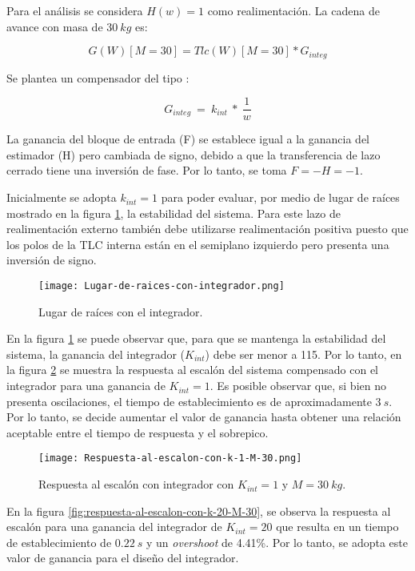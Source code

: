  Para el an\'{a}lisis se considera $H(w)=1$ como realimentaci\'{o}n. La cadena de avance con masa de $30\:kg$ es:

\[G(W)[M=30]=Tlc(W)[M=30]*G_{integ}\] 

 Se  plantea un compensador del tipo :

\[G_{integ}\ =\ k_{int}\ *\ \frac{1}{w}\] 

 La ganancia del bloque de entrada (F) se establece igual a la ganancia del estimador (H) pero cambiada de signo, debido a que la transferencia de lazo cerrado tiene una inversi\'{o}n de fase. Por lo tanto, se toma $F=-H=-1$.

 Inicialmente se adopta $k_{int} = 1$ para poder evaluar, por medio de lugar de ra\'{i}ces mostrado en la figura \ref{fig:lugar-de-raices-con-integrador}, la estabilidad del sistema. Para este lazo de realimentaci\'{o}n externo tambi\'{e}n debe utilizarse realimentaci\'{o}n positiva puesto que los polos de la TLC interna est\'{a}n en el semiplano izquierdo pero presenta una inversi\'{o}n de signo.


\begin{figure}[H]
	\centering
	\texttt{[image: Lugar-de-raices-con-integrador.png]}
	\caption{Lugar de raíces con el integrador.}
	\label{fig:lugar-de-raices-con-integrador}
\end{figure}


 En la figura \ref{fig:lugar-de-raices-con-integrador} se puede observar que, para que se mantenga la estabilidad del sistema, la ganancia del integrador ($K_{int}$) debe ser menor a 115. Por lo tanto, en la figura \ref{fig:respuesta-al-escalon-con-k-1-M-30} se muestra la respuesta al escal\'{o}n del sistema compensado con el integrador para una ganancia de $K_{int}=1$.  Es posible observar que, si bien no presenta oscilaciones, el tiempo de establecimiento es de aproximadamente $3\:s$. Por lo tanto, se decide aumentar el valor de ganancia hasta obtener una relaci\'{o}n aceptable entre el tiempo de respuesta y el sobrepico.


\begin{figure}[H]
	\centering
	\texttt{[image: Respuesta-al-escalon-con-k-1-M-30.png]}
	\caption{Respuesta al escalón con integrador con $K_{int} =1$ y $M=30\:kg$.}
	\label{fig:respuesta-al-escalon-con-k-1-M-30}
\end{figure}


 En la figura \ref{fig:respuesta-al-escalon-con-k-20-M-30}, se observa la respuesta al escal\'{o}n para una ganancia del integrador de $K_{int}=20$ que resulta en un tiempo de establecimiento de $0.22\:s$ y un \textsl{overshoot} de 4.41\%. Por lo tanto, se adopta este valor de ganancia para el dise\~{n}o del integrador.


